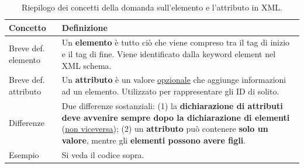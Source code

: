 \documentclass[a4paper]{article}
\begin{document}
	\noindent
	\begin{table}[!htp]
		\centering
		\begin{tabular}{@{} l p{22em} @{}}
			\toprule
			Concetto & Definizione \\
			\midrule
			Breve def. elemento		& Un \textbf{elemento} è tutto ciò che viene compreso tra il tag di inizio e il tag di fine. Viene identificato dalla keyword \textsf{element} nel XML schema. \\ [.5em]
			Breve def. attributo	& Un \textbf{attributo} è un valore \underline{opzionale} che aggiunge informazioni ad un elemento. Utilizzato per rappresentare gli ID di solito. \\ [.5em]
			Differenze				& Due differenze sostanziali: (1) la \textbf{dichiarazione di attributi deve avvenire sempre dopo la dichiarazione di elementi} (\underline{non viceversa}); (2) un \textbf{attributo} può contenere \textbf{solo un valore}, mentre gli \textbf{elementi possono avere figli}.\\ [.5em]
			Esempio					& Si veda il codice sopra. \\
			\bottomrule
		\end{tabular}
		\caption{Riepilogo dei concetti della domanda sull'elemento e l'attributo in XML.}
	\end{table}\newpage
	
\end{document}
